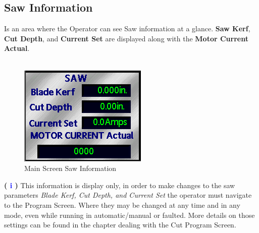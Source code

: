 \subsection{Saw Information}
Is an area where the Operator can see Saw information at a glance. \textbf{Saw Kerf}, \textbf{Cut Depth}, and \textbf{Current Set} are displayed along with the \textbf{Motor Current Actual}.
\\
\\
\begin{figure}
	\centering
	\includegraphics[width=.5\linewidth]{screen-captures/saw-info}
	\caption{Main Screen Saw Information}
	\label{fig:main-sawinfo}
\end{figure}
\textbf{\LARGE ( \textcolor{blue}{i} )} This information is display only, in order to make changes to the saw parameters \textit{Blade Kerf, Cut Depth, and Current Set} the operator must navigate to the Program Screen. Where they may be changed at any time and in any mode, even while running in automatic/manual or faulted. More details on those settings can be found in the chapter dealing with the Cut Program Screen.
\\
\\
\\
\\
\\
\\
\\
\\
\\
\\
\pagebreak
